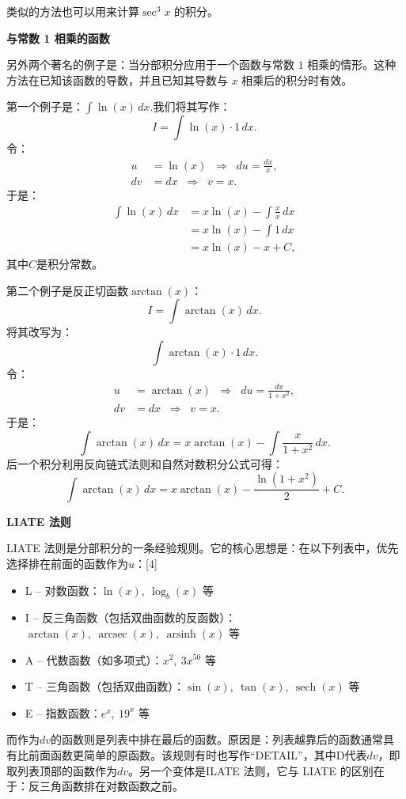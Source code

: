 类似的方法也可以用来计算$\sec^{3}x$ 的积分。

\textbf{与常数 1 相乘的函数}

另外两个著名的例子是：当分部积分应用于一个函数与常数 $1$ 相乘的情形。这种方法在已知该函数的导数，并且已知其导数与 $x$ 相乘后的积分时有效。

第一个例子是：$\int \ln(x)\,dx$.我们将其写作：
$$
I = \int \ln(x)\cdot 1\,dx.~
$$
令：
$$
\begin{aligned}
u &= \ln(x) \;\;\Rightarrow\;\; du = \frac{dx}{x},\\
dv &= dx \;\;\Rightarrow\;\; v = x.
\end{aligned}~
$$
于是：
$$
\begin{aligned}
\int \ln(x)\,dx 
&= x\ln(x) - \int \frac{x}{x}\,dx \\
&= x\ln(x) - \int 1\,dx \\
&= x\ln(x) - x + C,
\end{aligned}~
$$
其中$C$是积分常数。

第二个例子是反正切函数$\arctan(x)$：
$$
I = \int \arctan(x)\,dx.~
$$
将其改写为：
$$
\int \arctan(x)\cdot 1\,dx.~
$$
令：
$$
\begin{aligned}
u &= \arctan(x) \;\;\Rightarrow\;\; du = \frac{dx}{1+x^{2}},\\
dv &= dx \;\;\Rightarrow\;\; v = x.
\end{aligned}~
$$
于是：
$$
\int \arctan(x)\,dx 
= x\arctan(x) - \int \frac{x}{1+x^{2}}\,dx.~
$$
后一个积分利用反向链式法则和自然对数积分公式可得：
$$
\int \arctan(x)\,dx 
= x\arctan(x) - \frac{\ln(1+x^{2})}{2} + C.~
$$

\textbf{LIATE 法则}

LIATE 法则是分部积分的一条经验规则。它的核心思想是：在以下列表中，优先选择排在前面的函数作为$u$：[4]
\begin{itemize}
\item L – 对数函数：$\ln(x),\ \log_{b}(x)$ 等
\item I – 反三角函数（包括双曲函数的反函数）：$\arctan(x),\ \operatorname{arcsec}(x),\ \operatorname{arsinh}(x)$ 等
\item A – 代数函数（如多项式）：$x^{2},\ 3x^{50}$ 等
\item T – 三角函数（包括双曲函数）：$\sin(x),\ \tan(x),\ \operatorname{sech}(x)$ 等
\item E – 指数函数：$e^{x},\ 19^{x}$ 等
\end{itemize}
而作为$dv$的函数则是列表中排在最后的函数。原因是：列表越靠后的函数通常具有比前面函数更简单的原函数。该规则有时也写作“DETAIL”，其中D代表$dv$，即取列表顶部的函数作为$dv$。另一个变体是ILATE 法则，它与 LIATE 的区别在于：反三角函数排在对数函数之前。

